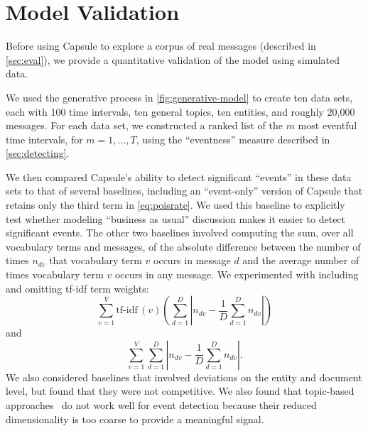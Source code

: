
\section{Model Validation}
\label{sec:valid}




Before using Capsule to explore a corpus of real messages (described
in \cref{sec:eval}), we provide a quantitative validation of the model
using simulated data.

We used the generative process in \cref{fig:generative-model} to
create ten data sets, each with 100 time intervals, ten general
topics, ten entities, and roughly 20,000 messages. For each data set,
we constructed a ranked list of the $m$ most eventful time intervals,
for $m = 1, \ldots, T$, using the ``eventness'' measure described in
\cref{sec:detecting}.

We then compared Capsule's ability to detect significant ``events'' in
these data sets to that of several baselines, including an
``event-only'' version of Capsule that retains only the third term in
\cref{eq:poisrate}. We used this baseline to explicitly test whether
modeling ``business as usual'' discussion makes it easier to detect
significant events. The other two baselines involved computing the
sum, over all vocabulary terms and messages, of the absolute
difference between the number of times $n_{dv}$ that vocabulary term
$v$ occurs in message $d$ and the average number of times vocabulary
term $v$ occurs in any message. We experimented with including and
omitting tf-idf term weights:
\begin{equation}
  \sum_{v=1}^V \textrm{tf-idf}\,(v) \left(\sum_{d=1}^D \left\lvert n_{dv} - \frac{1}{D}\sum_{d=1}^D
  n_{dv} \right\rvert\right)
\label{eq:tfidfwordev}
\end{equation}
and
\begin{equation}
  \sum_{v=1}^V \sum_{d=1}^D \left\lvert n_{dv} - \frac{1}{D}\sum_{d=1}^D
  n_{dv} \right\rvert.
\label{eq:wordev}
\end{equation}
We also considered baselines that involved deviations on the entity
and document level, but found that they were not competitive. We also
found that topic-based approaches~\cite{dou2012leadline} do not work
well for event detection because their reduced dimensionality is too
coarse to provide a meaningful signal.

